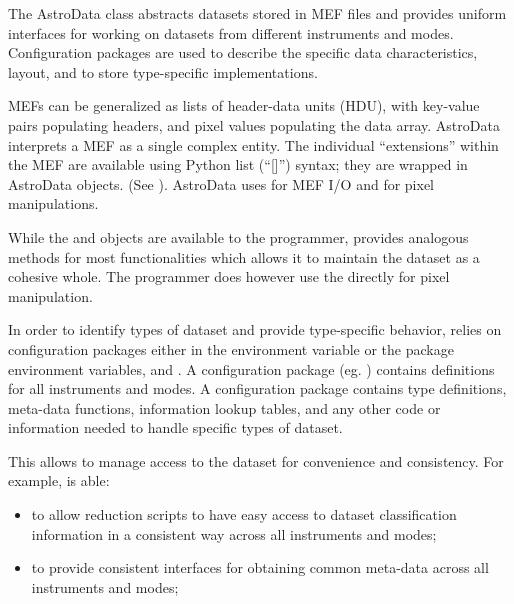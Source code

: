 \documentclass[letterpaper,10pt,english]{sphinxmanual}
\begin{document}
\begin{fulllineitems}
\label{astro_class:astrodata.AstroData.AstroData}
The AstroData class abstracts datasets stored in MEF files
and provides uniform interfaces for working on datasets from different
instruments and modes.  Configuration packages are used to describe
the specific data characteristics, layout, and to store type-specific
implementations.

MEFs can be generalized as lists of header-data units (HDU), with key-value
pairs populating headers, and pixel values populating the data array.
AstroData interprets a MEF as a single complex entity.  The individual
``extensions'' within the MEF are available using Python list (``{[}{]}'') syntax;
they are wrapped in AstroData objects. 
(See ).
AstroData uses  for MEF I/O and  for pixel manipulations.

While the  and  objects are available to the programmer, 
 provides analogous methods for most  functionalities
which allows it to maintain the dataset  as a cohesive whole. The programmer
does however use the  directly for pixel manipulation.

In order to identify types of dataset and provide type-specific behavior,
 relies on configuration packages either in the 
environment variable or the  package environment variables,
 and . A configuration package 
(eg. ) contains definitions for all instruments and
modes. A configuration package contains type definitions, meta-data 
functions, information lookup tables, and any other code
or information needed to handle specific types of dataset.

This allows  to manage access to the dataset for convenience
and consistency. For example,  is able:
\begin{itemize}
\item {} 
to allow reduction scripts to have easy access to dataset classification
information in a consistent way across all instruments and modes;

\item {} 
to provide consistent interfaces for obtaining common meta-data across all
instruments and modes;


\end{itemize}
\end{fulllineitems}
\end{document}
